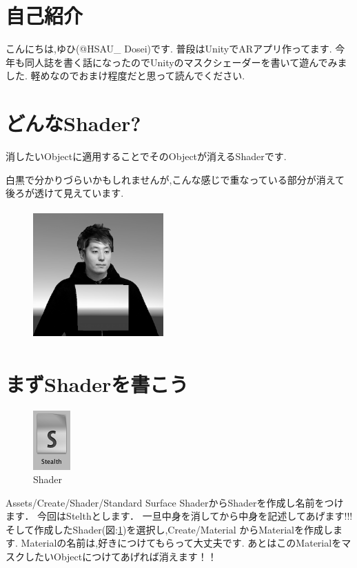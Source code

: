 \section{自己紹介}
こんにちは,ゆひ(@HSAU\_ Dosei)です. 普段はUnityでARアプリ作ってます. 今年も同人誌を書く話になったのでUnityのマスクシェーダーを書いて遊んでみました. 軽めなのでおまけ程度だと思って読んでください.
\section{どんなShader?}
消したいObjectに適用することでそのObjectが消えるShaderです.

白黒で分かりづらいかもしれませんが,こんな感じで重なっている部分が消えて後ろが透けて見えています.
\begin{figure}[htbp]
\centering
\includegraphics[width=5cm,height=5cm]{./assets/yuhiasset/hsau_dosei2.png}
\end{figure}

\newpage

\section{まずShaderを書こう}
\begin{figure}[h]
\centering
\includegraphics[]{./assets/yuhiasset/hsau_dosei1.png}
\caption{Shader}
\label{fig:shader}
\end{figure}
Assets/Create/Shader/Standard Surface ShaderからShaderを作成し名前をつけます．
今回はStelthとします．
一旦中身を消してから中身を記述してあげます!!!
そして作成したShader(図:\ref{fig:shader})を選択し,Create/Material からMaterialを作成します.
Materialの名前は,好きにつけてもらって大丈夫です.
あとはこのMaterialをマスクしたいObjectにつけてあげれば消えます！！

